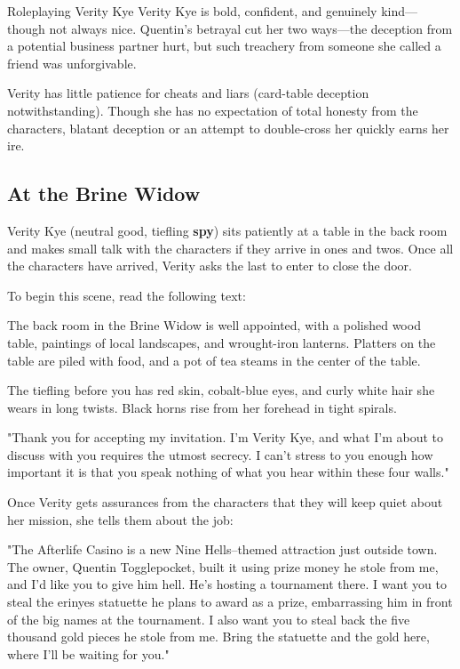 \documentclass[10pt,a4paper,twoside,bg=print,twocolumn,openany,nodeprecatedcode]{dndbook}
\begin{document}
\begin{DndSidebar}[float=!b]{Roleplaying Verity Kye}
Verity Kye is bold, confident, and genuinely kind—though not always nice. Quentin's betrayal cut her two ways—the deception from a potential business partner hurt, but such treachery from someone she called a friend was unforgivable.



Verity has little patience for cheats and liars (card-table deception notwithstanding). Though she has no expectation of total honesty from the characters, blatant deception or an attempt to double-cross her quickly earns her ire.



\end{DndSidebar}

\subsection{At the Brine Widow}
Verity Kye (neutral good, tiefling \textbf{spy}) sits patiently at a table in the back room and makes small talk with the characters if they arrive in ones and twos. Once all the characters have arrived, Verity asks the last to enter to close the door.

To begin this scene, read the following text:

\begin{DndReadAloud}{}
The back room in the Brine Widow is well appointed, with a polished wood table, paintings of local landscapes, and wrought-iron lanterns. Platters on the table are piled with food, and a pot of tea steams in the center of the table.

The tiefling before you has red skin, cobalt-blue eyes, and curly white hair she wears in long twists. Black horns rise from her forehead in tight spirals.

"Thank you for accepting my invitation. I'm Verity Kye, and what I'm about to discuss with you requires the utmost secrecy. I can't stress to you enough how important it is that you speak nothing of what you hear within these four walls."

\end{DndReadAloud}

Once Verity gets assurances from the characters that they will keep quiet about her mission, she tells them about the job:

\begin{DndReadAloud}{}
"The Afterlife Casino is a new Nine Hells–themed attraction just outside town. The owner, Quentin Togglepocket, built it using prize money he stole from me, and I'd like you to give him hell. He's hosting a tournament there. I want you to steal the erinyes statuette he plans to award as a prize, embarrassing him in front of the big names at the tournament. I also want you to steal back the five thousand gold pieces he stole from me. Bring the statuette and the gold here, where I'll be waiting for you."

\end{DndReadAloud}
\end{document}
